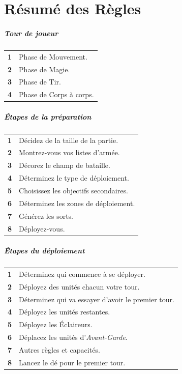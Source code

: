 
\part{Résumé des Règles}

\begin{table}[h!]
\begin{minipage}[t]{.35\linewidth}
\footnotesize

\subsubsection*{Tour de joueur}

\noindent
\begin{tabular}{c|m{4.5cm}}
\textbf{1} & Phase de Mouvement. \tabularnewline
\textbf{2} & Phase de Magie. \tabularnewline
\textbf{3} & Phase de Tir. \tabularnewline
\textbf{4} & Phase de Corps à corps. \tabularnewline
\end{tabular}

\smallskip

\subsubsection*{Étapes de la préparation}

\noindent
\begin{tabular}{c|m{4.5cm}}
\textbf{1} & Décidez de la taille de la partie. \tabularnewline
\textbf{2} & Montrez-vous vos listes d'armée. \tabularnewline
\textbf{3} & Décorez le champ de bataille. \tabularnewline
\textbf{4} & Déterminez le type de déploiement. \tabularnewline
\textbf{5} & Choisissez les objectifs secondaires. \tabularnewline
\textbf{6} & Déterminez les zones de déploiement. \tabularnewline
\textbf{7} & Générez les sorts. \tabularnewline
\textbf{8} & Déployez-vous. \tabularnewline
\end{tabular}

\smallskip

\subsubsection*{Étapes du déploiement}

\begin{tabular}{c|m{4.5cm}}
\textbf{1} & Déterminez qui commence à se déployer. \tabularnewline
\textbf{2} & Déployez des unités chacun votre tour. \tabularnewline
\textbf{3} & Déterminez qui va essayer d'avoir le premier tour. \tabularnewline
\textbf{4} & Déployez les unités restantes. \tabularnewline
\textbf{5} & Déployez les Éclaireurs. \tabularnewline
\textbf{6} & Déplacez les unités d'\emph{Avant-Garde}. \tabularnewline
\textbf{7} & Autres règles et capacités. \tabularnewline
\textbf{8} & Lancez le dé pour le premier tour. \tabularnewline
\end{tabular}


\end{minipage}
\end{table}
